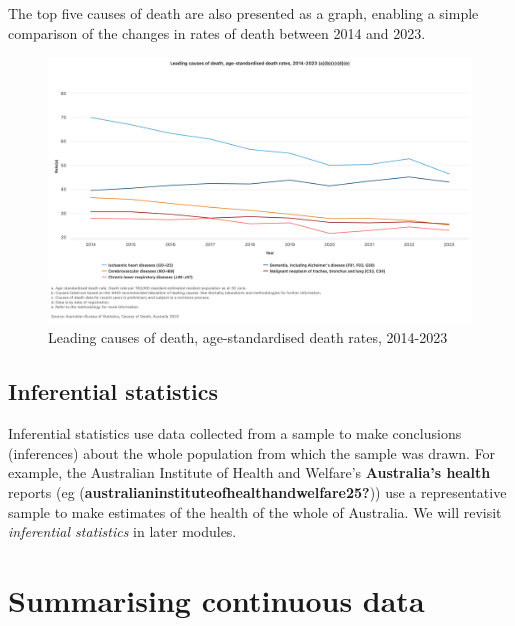 \documentclass[
  a4paper,
]{memoir}
\begin{document}
The top five causes of death are also presented as a graph, enabling a
simple comparison of the changes in rates of death between 2014 and
2023.

\begin{figure}

{\centering \includegraphics[width=1\textwidth,height=\textheight]{img/mod01/cause-death.png}

}

\caption{\label{fig-1-1}Leading causes of death, age-standardised death
rates, 2014-2023}

\end{figure}

\hypertarget{inferential-statistics}{%
\subsection{Inferential statistics}\label{inferential-statistics}}

Inferential statistics use data collected from a sample to make
conclusions (inferences) about the whole population from which the
sample was drawn. For example, the Australian Institute of Health and
Welfare's \textbf{Australia's health} reports (eg
(\textbf{australianinstituteofhealthandwelfare25?})) use a
representative sample to make estimates of the health of the whole of
Australia. We will revisit \emph{inferential statistics} in later
modules.

\hypertarget{summarising-continuous-data}{%
\section{Summarising continuous
data}\label{summarising-continuous-data}}
\end{document}
